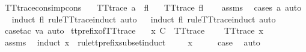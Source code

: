 \begin{isabellebody}
\endisatagproof
{\isafoldproof}%
%
\isadelimproof
\isanewline
%
\endisadelimproof
\isanewline
{}\isamarkupfalse%
\ TT{}{\isacharunderscore}trace{\isacharunderscore}cons{\isacharunderscore}imp{\isacharunderscore}cons{\isacharcolon}\isanewline
\ \ \ {\isachardoublequoteopen}TT{}{\isacharunderscore}trace\ {\isacharparenleft}a\ {\isacharhash}\ fl{\isacharparenright}{\isachardoublequoteclose}\isanewline
\ \ \ {\isachardoublequoteopen}TT{}{\isacharunderscore}trace\ fl{\isachardoublequoteclose}\isanewline
%
\isadelimproof
\ \ %
\endisadelimproof
%
\isatagproof
{}\isamarkupfalse%
\ assms\ \isamarkupfalse%
\ {\isacharparenleft}cases\ a{\isacharcomma}\ auto{\isacharparenright}\isanewline
\ \ \isamarkupfalse%
{\isacharparenleft}induct\ fl\ rule{\isacharcolon}TT{}{\isacharunderscore}trace{\isachardot}induct{\isacharcomma}\ auto{\isacharparenright}\isanewline
\ \ \isamarkupfalse%
{\isacharparenleft}induct\ fl\ rule{\isacharcolon}TT{}{\isacharunderscore}trace{\isachardot}induct{\isacharcomma}\ auto{\isacharparenright}\isanewline
\ \ \isamarkupfalse%
\ {\isacharparenleft}case{\isacharunderscore}tac\ va{\isacharcomma}\ auto{\isacharparenright}%
\endisatagproof
{\isafoldproof}%
%
\isadelimproof
\isanewline
%
\endisadelimproof
\isanewline
{}\isamarkupfalse%
\ tt{\isacharunderscore}prefix{\isacharunderscore}of{\isacharunderscore}TT{}{\isacharunderscore}trace{\isacharcolon}\isanewline
\ \ \ {\isachardoublequoteopen}x\ {\isasymlesssim}\isactrlsub C\ {\isasymsigma}{\isachardoublequoteclose}\ {\isachardoublequoteopen}TT{}{\isacharunderscore}trace\ {\isasymsigma}{\isachardoublequoteclose}\isanewline
\ \ \ {\isachardoublequoteopen}TT{}{\isacharunderscore}trace\ x{\isachardoublequoteclose}\isanewline
%
\isadelimproof
\ \ %
\endisadelimproof
%
\isatagproof
{}\isamarkupfalse%
\ assms\ \isanewline
{}\isamarkupfalse%
\ {\isacharparenleft}induct\ x\ {\isasymsigma}\ rule{\isacharcolon}tt{\isacharunderscore}prefix{\isacharunderscore}subset{\isachardot}induct{\isacharparenright}\isanewline
\ \ \isamarkupfalse%
\ {\isacharparenleft}{}\ x{\isacharparenright}\isanewline
\ \ \isamarkupfalse%
\ \isamarkupfalse%
\ {\isacharquery}case\ \isamarkupfalse%
\ auto\isanewline
{}\isamarkupfalse%

\end{isabellebody}

